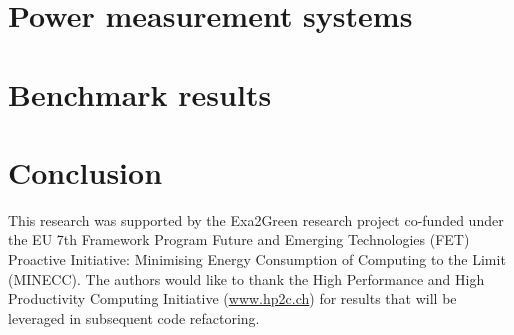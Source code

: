 \documentclass[twocolumn]{svjour3}           %
\DeclareRobustCommand\IPCClongname{}
\begin{document}
\section{Power measurement systems}
\label{sec:3}


\section{Benchmark results}
\label{sec:4}

\section{Conclusion}
\label{concl}




\begin{acknowledgements}
This  research  was  supported   by  the  Exa2Green  research  project
co-funded  under the  EU  7th Framework  Program  Future and  Emerging
Technologies (FET) Proactive Initiative: Minimising Energy Consumption
of Computing to  the Limit (MINECC).  The authors  would like to thank
the  High  Performance  and  High  Productivity  Computing  Initiative
(\url{www.hp2c.ch}) for  results that will be  leveraged in subsequent
code refactoring.
\end{acknowledgements}

\DeclareRobustCommand\IPCClongname{ - Intergovernmental Panel on Climate Change}



\end{document}
